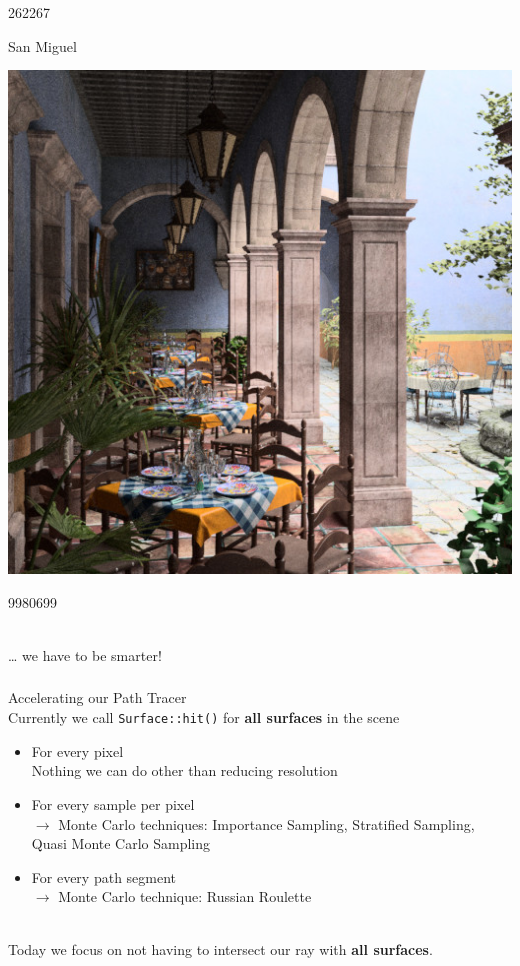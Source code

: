 \documentclass[utf8,stillsansserifmath,fleqn,t]{beamer}
\newcommand{\code}[1]{\texttt{#1}}
\begin{document}
\begin{frame}[label=acceleration-1]
\begin{minipage}{.23\textwidth}
\centerline{262267}
\end{minipage}\hfill
\begin{minipage}{.23\textwidth}
\centerline{San Miguel}
\centerline{\includegraphics[width=\textwidth]{./fig/trianglecount-sanmiguel.jpg}}
\centerline{9980699}
\end{minipage}\\[1ex]
\ldots{} we have to be smarter!
\end{frame}

\begin{frame}[label=acceleration-2]
\frametitle{\insertsection}
Accelerating our Path Tracer\\[1ex]
Currently we call \code{Surface::hit()} for \textbf{all surfaces} in the scene
\begin{itemize}
\item For every pixel\\
    Nothing we can do other than reducing resolution
\item For every sample per pixel\\
    $\rightarrow$ Monte Carlo techniques: Importance Sampling, Stratified Sampling, Quasi Monte Carlo Sampling
\item For every path segment\\
    $\rightarrow$ Monte Carlo technique: Russian Roulette
\end{itemize}
~\\
Today we focus on not having to intersect our ray with \textbf{all surfaces}.
\end{frame}
\end{document}
